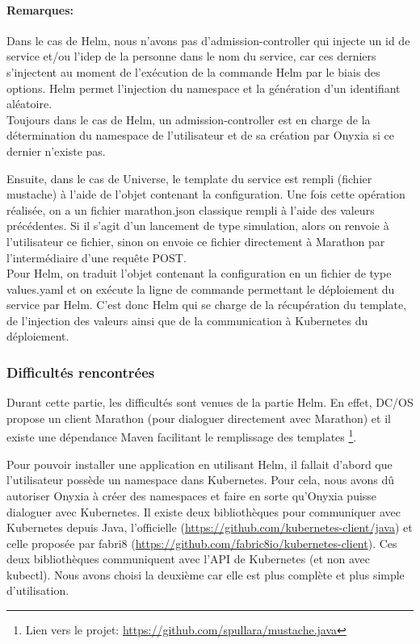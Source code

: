 \documentclass[11pt,fleqn]{book} %
\begin{document}
\vspace{-1cm}
\begin{interrupt}
\paragraph{Remarques:}
 Dans le cas de Helm, nous n'avons pas d'admission-controller qui injecte un id de service et/ou l'idep de la personne dans le nom du service, car ces derniers s'injectent au moment de l'exécution de la commande Helm par le biais des options. Helm permet l'injection du namespace et la génération d'un identifiant aléatoire. \\
 
 Toujours dans le cas de Helm, un admission-controller est en charge de la détermination du namespace de l'utilisateur et de sa création par Onyxia si ce dernier n'existe pas.
\end{interrupt}
Ensuite, dans le cas de Universe, le template du service est rempli (fichier mustache) à l'aide de l'objet contenant la configuration. Une fois cette opération réalisée, on a un fichier marathon.json classique rempli à l'aide des valeurs précédentes. Si il s'agit d'un lancement de type simulation, alors on renvoie à l'utilisateur ce fichier, sinon on envoie ce fichier directement à Marathon par l'intermédiaire d'une requête POST.\\

Pour Helm, on traduit l'objet contenant la configuration en un fichier de type values.yaml et on exécute la ligne de commande permettant le déploiement du service par Helm. C'est donc Helm qui se charge de la récupération du template, de l'injection des valeurs ainsi que de la communication à Kubernetes du déploiement.

\subsubsection{Difficultés rencontrées}
Durant cette partie, les difficultés sont venues de la partie Helm. En effet, DC/OS propose un client Marathon (pour dialoguer directement avec Marathon) et il existe une dépendance Maven facilitant le remplissage des templates \footnote{Lien vers le projet: \url{https://github.com/spullara/mustache.java}}.\newline

Pour pouvoir installer une application en utilisant Helm, il fallait d'abord que l'utilisateur possède un namespace dans Kubernetes. Pour cela, nous avons dû autoriser Onyxia à créer des namespaces et faire en sorte qu'Onyxia puisse dialoguer avec Kubernetes. Il existe deux bibliothèques pour communiquer avec Kubernetes depuis Java, l'officielle (\url{https://github.com/kubernetes-client/java}) et celle proposée par fabri8 (\url{https://github.com/fabric8io/kubernetes-client}). Ces deux bibliothèques communiquent avec l'API de Kubernetes (et non avec kubectl). Nous avons choisi la deuxième car elle est plus complète et plus simple d'utilisation. \newline
\end{document}

